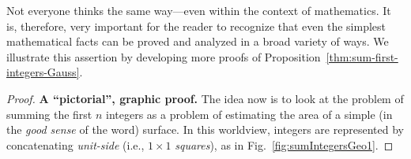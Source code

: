 Not everyone thinks the same way---even within the context of
mathematics.  It is, therefore, very important for the reader to
recognize that even the simplest mathematical facts can be proved and
analyzed in a broad variety of ways.  We illustrate this assertion by
developing more proofs of Proposition~\ref{thm:sum-first-integers-Gauss}.

\begin{proof}
{\bf A ``pictorial'', graphic proof.}
%
The idea now is to look at the problem of summing the first $n$
integers as a problem of estimating the area of a simple (in the
\textit{good sense} of the word) surface.  In this worldview, integers
are represented by concatenating {\it unit-side} (i.e., $1
\times 1$  {\it squares}), as in
Fig.~\ref{fig:sumIntegersGeo1}.


\end{proof}
